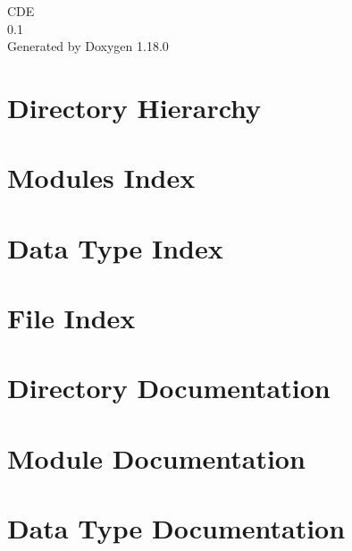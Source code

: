 \documentclass[twoside]{book}
\newcommand{\+}{\discretionary{\mbox{\scriptsize$\hookleftarrow$}}{}{}}
\newcommand{\clearemptydoublepage}{%
    \newpage{\pagestyle{empty}\cleardoublepage}%
  }
\begin{document}
  \raggedbottom
    \hypersetup{pageanchor=false,
                bookmarksnumbered=true,
                pdfencoding=unicode
               }
  \begin{titlepage}
  \vspace*{7cm}
  \begin{center}%
  {\Large CDE}\\
  [1ex]\large 0.\+1 \\
  \vspace*{1cm}
  {\large Generated by Doxygen 1.18.0}\\
  \end{center}
  \end{titlepage}
  \clearemptydoublepage
  \tableofcontents
  \clearemptydoublepage
  \hypersetup{pageanchor=true}

\chapter{Directory Hierarchy}

\chapter{Modules Index}

\chapter{Data Type Index}

\chapter{File Index}

\chapter{Directory Documentation}


\chapter{Module Documentation}









\chapter{Data Type Documentation}







\end{document}
